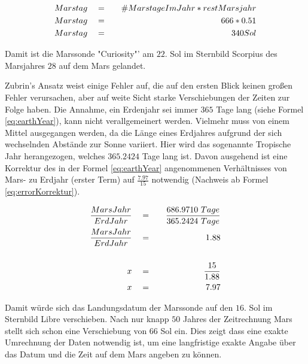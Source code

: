 \begin{eqnarray}
	Marstag \quad & = & \quad \#MarstageImJahr * restMarsjahr \\
	Marstag \quad & = & \quad 666 * 0.51 \notag\\
	Marstag \quad & = & \quad 340 Sol \notag
	\label{eq:MarsMonthSol}
\end{eqnarray}

Damit ist die Marssonde "Curiosity"' am $22.$ Sol im Sternbild Scorpius des 
Marsjahres $28$ auf dem Mars gelandet.

Zubrin's Ansatz weist einige Fehler auf, die auf den ersten Blick keinen großen
Fehler verursachen, aber auf weite Sicht starke Verschiebungen der
Zeiten zur Folge haben. Die Annahme, ein Erdenjahr sei immer $365$ Tage lang (siehe Formel
\ref{eq:earthYear}), kann nicht verallgemeinert werden. Vielmehr muss von einem
Mittel ausgegangen werden, da die L{\"a}nge eines Erdjahres aufgrund der sich
wechselnden Abst{\"a}nde zur Sonne variiert. Hier wird das sogenannte Tropische Jahr
herangezogen, welches $365.2424$ Tage lang ist. Davon ausgehend ist eine
Korrektur des in der Formel \ref{eq:earthYear} angenommenen Verh{\"a}ltnisses von
Mars- zu Erdjahr (erster Term) auf $\frac{7.97}{15}$ notwendig (Nachweis ab
Formel \ref{eq:errorKorrektur}).

\begin{eqnarray}
	\frac{MarsJahr}{ErdJahr} \quad & = & \quad \frac{686.9710 \ Tage}{365.2424 \ Tage}
	\\
	\label{eq:errorKorrektur}  
	\frac{MarsJahr}{ErdJahr} \quad & = & \quad 1.88 \notag\\
	\notag\\
	x \quad & = & \quad \frac{15}{1.88} \notag\\
	x \quad & = & \quad 7.97 \notag
\end{eqnarray}

Damit w{\"u}rde sich das Landungsdatum der Marssonde auf den $16.$ Sol im Sternbild
Libre verschieben. Nach nur knapp $50$ Jahres der Zeitrechnung Mars stellt sich
schon eine Verschiebung von $66$ Sol ein. Dies zeigt dass eine exakte Umrechnung
der Daten notwendig ist, um eine langfristige exakte Angabe {\"u}ber das
Datum und die Zeit auf dem Mars angeben zu können.